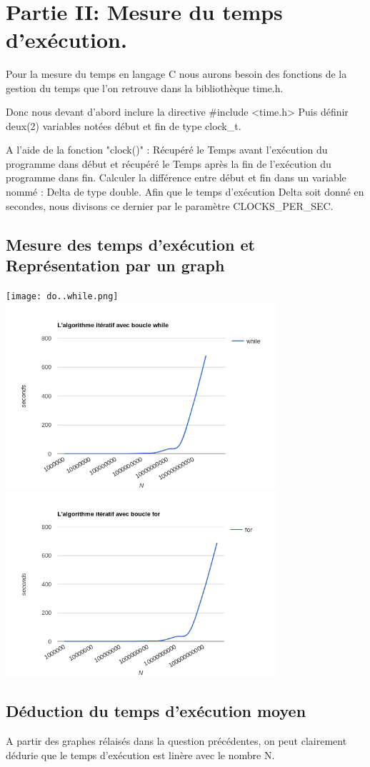 \documentclass[•]{article}
\begin{document}
\textrm{  }
\\

\section{Partie II: Mesure du temps d'exécution.}
\textrm{
Pour la mesure du temps en langage C nous aurons besoin des fonctions de la gestion du temps que l'on retrouve dans la bibliothèque time.h.}

\textrm{Donc nous devant d'abord inclure la directive \#include <time.h>
Puis définir deux(2) variables notées début et fin de type clock\_t.}

\textrm{A l'aide de la fonction "clock()" :
Récupéré le Temps avant l'exécution du programme dans début et
récupéré le Temps après la fin de l'exécution du programme dans fin.}
\textrm{Calculer la différence entre début et fin dans un variable nommé : Delta de type double.} 
\textrm{Afin que le temps d'exécution Delta soit donné en secondes, nous divisons ce dernier par le paramètre CLOCKS\_PER\_SEC.}

\subsection{Mesure des temps d'exécution et Représentation par un graph}
\texttt{[image: do..while.png]}
\includegraphics[width=0.75\textwidth]{while.png}
\includegraphics[width=0.75\textwidth]{for.png}
\subsection{Déduction du temps d'exécution moyen}
A partir des graphes rélaisés dans la question précédentes, on peut clairement dédurie que le temps d'exécution est linère avec le nombre N.
\end{document}
